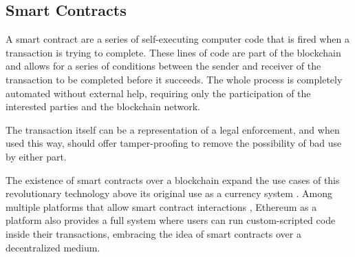 \subsection{Smart Contracts}

A smart contract are a series of self-executing computer code that is fired when a transaction is trying to complete. These lines of code are part of the blockchain and allows for a series of conditions between the sender and receiver of the transaction to be completed before it succeeds. The whole process is completely automated without external help, requiring only the participation of the interested parties and the blockchain network.

The transaction itself can be a representation of a legal enforcement, and when used this way, should offer tamper-proofing to remove the possibility of bad use by either part. \cite{templates}

The existence of smart contracts over a blockchain expand the use cases of this revolutionary technology above its original use as a currency system \cite{nakamoto} \cite{uses}. Among multiple platforms that allow smart contract interactions \cite{sense}\cite{lazy}, Ethereum \cite{ethereum }as a platform also provides a full system where users can run custom-scripted code inside their transactions, embracing the idea of smart contracts over a decentralized medium. \cite{hawk}



